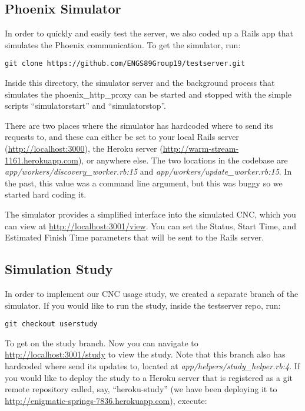 \documentclass[12pt,letterpaper,titlepage]{article}
\begin{document}
\subsection{Phoenix Simulator} \label{doc:PhoenixSimulator}

In order to quickly and easily test the server, we also coded up a Rails app that simulates the Phoenix communication. To get the simulator, run:

\begin{lstlisting}
git clone https://github.com/ENGS89Group19/testserver.git
\end{lstlisting}

Inside this directory, the simulator server and the background process that simulates the phoenix\_http\_proxy can be started and stopped with the simple scripts ``simulatorstart'' and ``simulatorstop''. 

There are two places where the simulator has hardcoded where to send its requests to, and these can either be set to your local Rails server (\url{http://localhost:3000}), the Heroku server (\url{http://warm-stream-1161.herokuapp.com}), or anywhere else. The two locations in the codebase are \textit{app/workers/discovery\_worker.rb:15} and \textit{app/workers/update\_worker.rb:15}. In the past, this value was a command line argument, but this was buggy so we started hard coding it.

The simulator provides a simplified interface into the simulated CNC, which you can view at \url{http://localhost:3001/view}. You can set the Status, Start Time, and Estimated Finish Time parameters that will be sent to the Rails server.

\subsection{Simulation Study} \label{doc:SimulationStudy}

In order to implement our CNC usage study, we created a separate branch of the simulator. If you would like to run the study, inside the testserver repo, run:

\begin{lstlisting}
git checkout userstudy
\end{lstlisting}

To get on the study branch. Now you can navigate to \url{http://localhost:3001/study} to view the study. Note that this branch also has hardcoded where send its updates to, located at \textit{app/helpers/study\_helper.rb:4}. If you would like to deploy the study to a Heroku server that is registered as a git remote repository called, say, ``heroku-study'' (we have been deploying it to \url{http://enigmatic-springs-7836.herokuapp.com}), execute:
\end{document}
